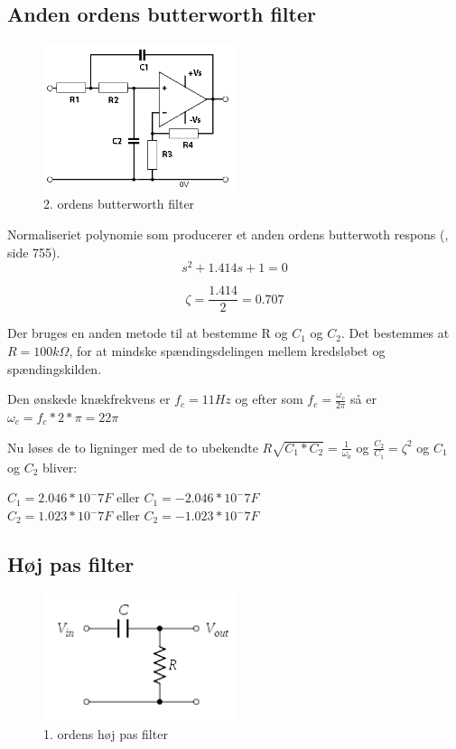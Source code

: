 \subsection{Anden ordens butterworth filter}
\begin{figure}[H]
	\centering
	\includegraphics[width = 0.5\textwidth]{Implementeringsdokument/billeder/2ordensButterworth.png}
	\caption{2. ordens butterworth filter}\label{fig:butterworth}
\end{figure}
Normaliseriet polynomie som producerer et anden ordens butterwoth respons (\cite{RefWorks:28}, side 755).
\begin{equation}
	s^2 + 1.414s +1 = 0 
\end{equation}

\begin{equation}
	\zeta = \frac{1.414}{2} = 0.707
\end{equation}

Der bruges en anden metode til at bestemme R og $C_1$ og $C_2$. Det bestemmes at $R = 100k \Omega $, for at mindske spændingsdelingen mellem kredsløbet og spændingskilden.

Den ønskede knækfrekvens er $f_c = 11Hz$ og efter som $f_c = \frac{\omega_c}{2 \pi} $ så er $\omega_c = f_c * 2 * \pi = 22 \pi $

Nu løses de to ligninger med de to ubekendte $R \sqrt{C_1 * C_2} = \frac{1}{\omega_0}$ og $ \frac{C_2}{C_1} = \zeta^2$ og $C_1$ og $C_2$ bliver:

$C_1 = 2.046*10^-7F$ eller $ C_1 = -2.046*10^-7F$ \\
$C_2 = 1.023*10^-7F$ eller $ C_2 = -1.023*10^-7F$ \\

\subsection{Høj pas filter}
\begin{figure}[H]
	\centering
	\includegraphics[width = 0.5\textwidth]{Implementeringsdokument/billeder/HighPass.png}
	\caption{1. ordens høj pas filter}\label{fig:highpass}
\end{figure}

